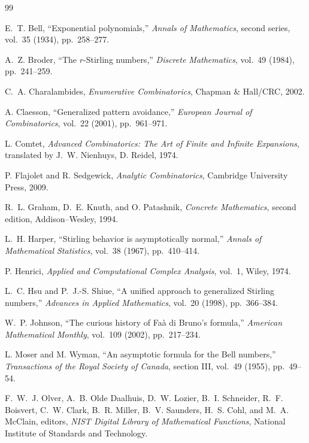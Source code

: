 \documentclass[11pt,a4paper,oneside,openany]{book}
\theoremstyle{definition}
\theoremstyle{remark}
\begin{document}
\begin{thebibliography}{99}

E.~T. Bell,
``Exponential polynomials,''
\emph{Annals of Mathematics}, second series, vol.~35 (1934), pp.~258--277.

A.~Z. Broder,
``The $r$-Stirling numbers,''
\emph{Discrete Mathematics}, vol.~49 (1984), pp.~241--259.

C.~A. Charalambides,
\emph{Enumerative Combinatorics},
Chapman \& Hall/CRC, 2002.

A. Claesson,
``Generalized pattern avoidance,''
\emph{European Journal of Combinatorics}, vol.~22 (2001), pp.~961--971.

L. Comtet,
\emph{Advanced Combinatorics: The Art of Finite and Infinite Expansions},
translated by J.~W. Nienhuys, D. Reidel, 1974.

P. Flajolet and R. Sedgewick,
\emph{Analytic Combinatorics},
Cambridge University Press, 2009.

R.~L. Graham, D.~E. Knuth, and O. Patashnik,
\emph{Concrete Mathematics}, second edition,
Addison--Wesley, 1994.

L.~H. Harper,
``Stirling behavior is asymptotically normal,''
\emph{Annals of Mathematical Statistics}, vol.~38 (1967), pp.~410--414.

P. Henrici,
\emph{Applied and Computational Complex Analysis}, vol.~1,
Wiley, 1974.

L.~C. Hsu and P.~J.-S. Shiue,
``A unified approach to generalized Stirling numbers,''
\emph{Advances in Applied Mathematics}, vol.~20 (1998), pp.~366--384.

W.~P. Johnson,
``The curious history of Faà di Bruno's formula,''
\emph{American Mathematical Monthly}, vol.~109 (2002), pp.~217--234.

L. Moser and M. Wyman,
``An asymptotic formula for the Bell numbers,''
\emph{Transactions of the Royal Society of Canada}, section III, vol.~49
(1955), pp.~49--54.

F.~W.~J. Olver, A.~B. Olde Daalhuis, D.~W. Lozier, B.~I. Schneider,
R.~F. Boisvert, C.~W. Clark, B.~R. Miller, B.~V. Saunders,
H.~S. Cohl, and M.~A. McClain, editors,
\emph{NIST Digital Library of Mathematical Functions},
National Institute of Standards and Technology.


\end{thebibliography}
\end{document}

